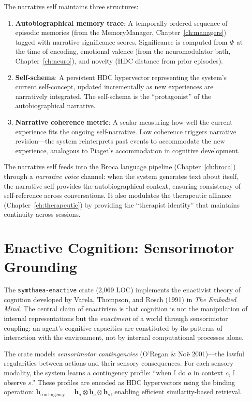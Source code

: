 \documentclass[12pt]{book}
\newcommand{\bind}{\otimes}
\begin{document}
The narrative self maintains three structures:

\begin{enumerate}
  \item \textbf{Autobiographical memory trace}: A temporally ordered sequence of episodic memories (from the MemoryManager, Chapter~\ref{ch:managers}) tagged with narrative significance scores. Significance is computed from $\Phi$ at the time of encoding, emotional valence (from the neuromodulator bath, Chapter~\ref{ch:neuro}), and novelty (HDC distance from prior episodes).
  \item \textbf{Self-schema}: A persistent HDC hypervector representing the system's current self-concept, updated incrementally as new experiences are narratively integrated. The self-schema is the ``protagonist'' of the autobiographical narrative.
  \item \textbf{Narrative coherence metric}: A scalar measuring how well the current experience fits the ongoing self-narrative. Low coherence triggers narrative revision---the system reinterprets past events to accommodate the new experience, analogous to Piaget's accommodation in cognitive development.
\end{enumerate}

The narrative self feeds into the Broca language pipeline (Chapter~\ref{ch:broca}) through a \textit{narrative voice} channel: when the system generates text about itself, the narrative self provides the autobiographical context, ensuring consistency of self-reference across conversations. It also modulates the therapeutic alliance (Chapter~\ref{ch:therapeutic}) by providing the ``therapist identity'' that maintains continuity across sessions.

\section{Enactive Cognition: Sensorimotor Grounding}

The \texttt{symthaea-enactive} crate (2,069 LOC) implements the enactivist theory of cognition developed by Varela, Thompson, and Rosch (1991) in \textit{The Embodied Mind}. The central claim of enactivism is that cognition is not the manipulation of internal representations but the \textit{enactment} of a world through sensorimotor coupling: an agent's cognitive capacities are constituted by its patterns of interaction with the environment, not by internal computational processes alone.

The crate models \textit{sensorimotor contingencies} (O'Regan \& No\"{e} 2001)---the lawful regularities between actions and their sensory consequences. For each sensory modality, the system learns a contingency profile: ``when I do $a$ in context $c$, I observe $s$.'' These profiles are encoded as HDC hypervectors using the binding operation: $\mathbf{h}_{\text{contingency}} = \mathbf{h}_a \bind \mathbf{h}_c \bind \mathbf{h}_s$, enabling efficient similarity-based retrieval.
\end{document}
